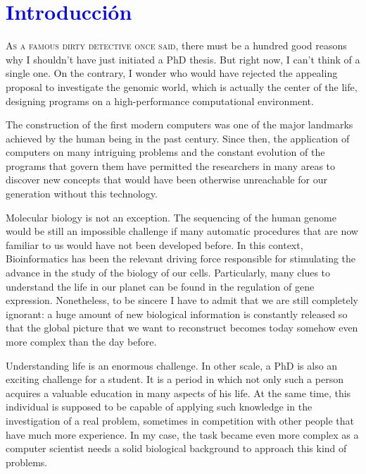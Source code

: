 \chapter*{\textcolor{blue}{\textbf{I}ntroducci\'{o}n}}

\lettrine[lines=4,loversize=-0.1,lraise=0.1,lhang=.2]{A}{s a famous dirty detective once said},
there must be a hundred good reasons why I shouldn't have just initiated a PhD thesis. But
right now, I can't think of a single one. On the contrary, I wonder who would have rejected
the appealing proposal to investigate the genomic world, which is actually the center of the life,
designing programs on a high-performance computational environment.

The construction of the first modern computers was one of the major landmarks achieved by
the human being in the past century. Since then, the application of computers on many
intriguing problems and the constant evolution of the programs that govern them have permitted
the researchers in many areas to discover new concepts that would have been otherwise
unreachable for our generation without this technology.

Molecular biology is not an exception. The sequencing of the human genome would be still
an impossible challenge if many automatic procedures that are now familiar to us would
have not been developed before. In this context, Bioinformatics has been the relevant driving
force responsible for stimulating the advance in the study of the biology of our cells.
Particularly, many clues to understand the life in our planet can be found in the regulation
of gene expression. Nonetheless, to be sincere I have to admit that we are still completely
ignorant: a huge amount of new biological information is constantly released so that the global
picture that we want to reconstruct becomes today somehow even more complex than the day before.

Understanding life is an enormous challenge. In other scale, a PhD is also an exciting challenge
for a student. It is a period in which not only such a person acquires a valuable education
in many aspects of his life. At the same time, this individual is supposed to be capable
of applying such knowledge in the investigation of a real problem, sometimes in competition
with other people that have much more experience. In my case, the task became even more complex
as a computer scientist needs a solid biological background to approach this kind of problems.

